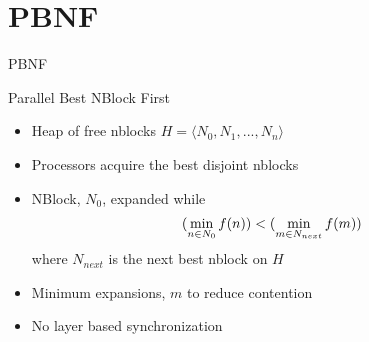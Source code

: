 \documentclass[style=unh]{powerdot}
\begin{document}
\section{PBNF}


\begin{slide}{PBNF}
  \vspace{.2in}
  \begin{center}
    Parallel Best NBlock First
  \end{center}

  \begin{itemize}
  \item Heap of free nblocks $H = \langle N_0, N_1, ..., N_n \rangle$
  \item Processors acquire the best disjoint nblocks
  \item NBlock, $N_0$, expanded while
    \begin{eqnarray*}
      (\mathop{\rm min}_{n \in N_0} f(n)) < (\mathop{\rm min}_{m \in N_{next}} f(m))
    \end{eqnarray*}
    where $N_{next}$ is the next best nblock on $H$
  \item Minimum expansions, $m$ to reduce contention
  \item No layer based synchronization
  \end{itemize}

\end{slide}

\end{document}
